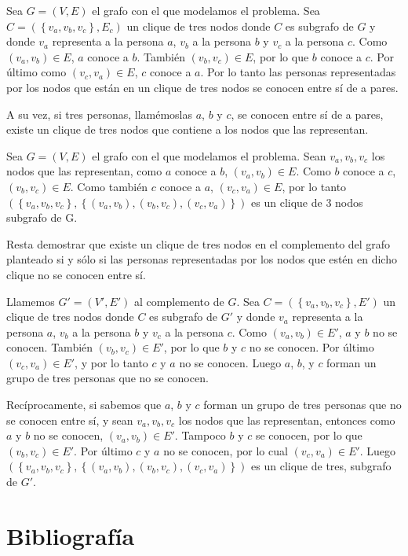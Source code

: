 \documentclass[a4paper, 12pt]{article}
\begin{document}
Sea $G = \left( V, E \right)$ el grafo con el que modelamos el problema. Sea $ C = \left( \left\lbrace v_a, v_b,v_c \right\rbrace, E_c \right) $ un clique de tres nodos donde $C$ es subgrafo de $G$ y donde $v_a$ representa a la persona $a$, $v_b$ a la persona $b$ y $v_c$ a la persona $c$. Como $\left( v_a, v_b \right) \in E $, $a$ conoce a $b$. También $\left(v_b,v_c\right) \in E$, por lo que $b$ conoce a $c$. Por último como $\left(v_c,v_a\right) \in E$, $c$ conoce a $a$. Por lo tanto las personas representadas por los nodos que están en un clique de tres nodos se conocen entre sí de a pares.


A su vez, si tres personas, llamémoslas $a$, $b$ y $c$, se conocen entre sí de a pares, existe un clique de tres nodos que contiene a los nodos que las representan. 


Sea $ G = \left( V, E \right) $ el grafo con el que modelamos el problema. Sean $v_a, v_b, v_c$ los nodos que las representan, como $a$ conoce a $b$, $\left( v_a,v_b \right) \in E $. Como $b$ conoce a $c$, $ \left(v_b, v_c \right) \in E$. Como también $c$ conoce a $a$, $ \left( v_c, v_a \right) \in E$, por lo tanto $\left( \left\lbrace v_a, v_b, v_c \right\rbrace, \left\lbrace  \left(v_a,v_b\right) , \left( v_b,v_c\right), \left( v_c, v_a\right) \right\rbrace\right)$ es un clique de 3 nodos subgrafo de G.


Resta demostrar que existe un clique de tres nodos en el complemento del grafo planteado si y sólo si las personas representadas por los nodos que estén en dicho clique no se conocen entre sí.


Llamemos $G' = \left( V', E' \right)$ al complemento de $G$.  Sea $ C = \left( \left\lbrace v_a, v_b,v_c \right\rbrace, E' \right) $ un clique de tres nodos donde $C$ es subgrafo de $G'$ y donde $v_a$ representa a la persona $a$, $v_b$ a la persona $b$ y $v_c$ a la persona $c$. Como $\left( v_a,v_b\right) \in E'$, $a$ y $b$ no se conocen. También $\left( v_b,v_c\right) \in E'$, por lo que $b$ y $c$ no se conocen. Por último $\left( v_c,v_a\right) \in E'$, y por lo tanto $c$ y $a$ no se conocen. Luego $a$, $b$, y $c$ forman un grupo de tres personas que no se conocen.



Recíprocamente, si sabemos que $a$, $b$ y $c$ forman un grupo de tres personas que no se conocen entre sí, y sean $v_a, v_b, v_c$ los nodos que las representan, entonces como $a$ y $b$ no se conocen, $\left(v_a,v_b\right) \in E'$. Tampoco $b$ y $c$ se conocen, por lo que $\left(v_b,v_c\right) \in E'$. Por último $c$ y $a$ no se conocen, por lo cual $\left(v_c,v_a\right) \in E'$. Luego $\left( \left\lbrace v_a, v_b, v_c \right\rbrace, \left\lbrace  \left(v_a,v_b\right) , \left( v_b,v_c\right), \left( v_c, v_a\right) \right\rbrace\right)$ es un clique de tres, subgrafo de $G'$.

\section{Bibliograf\'ia}
\end{document}
